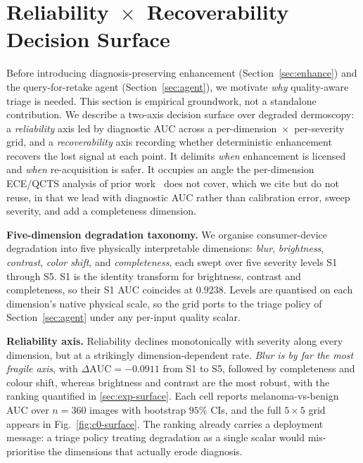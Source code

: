 
\section{Reliability~$\times$~Recoverability Decision Surface}
\label{sec:decision-surface}

Before introducing diagnosis-preserving enhancement (Section~\ref{sec:enhance}) and the query-for-retake agent (Section~\ref{sec:agent}), we motivate \emph{why} quality-aware triage is needed. This section is empirical groundwork, not a standalone contribution. We describe a two-axis decision surface over degraded dermoscopy: a \emph{reliability} axis led by diagnostic AUC across a per-dimension~$\times$~per-severity grid, and a \emph{recoverability} axis recording whether deterministic enhancement recovers the lost signal at each point. It delimits \emph{when} enhancement is licensed and \emph{when} re-acquisition is safer. It occupies an angle the per-dimension ECE/QCTS analysis of prior work~\citep{ANON-BMVC} does not cover, which we cite but do not reuse, in that we lead with diagnostic AUC rather than calibration error, sweep severity, and add a completeness dimension.

\textbf{Five-dimension degradation taxonomy.}
We organise consumer-device degradation into five physically interpretable dimensions: \emph{blur}, \emph{brightness}, \emph{contrast}, \emph{color shift}, and \emph{completeness}, each swept over five severity levels S1 through S5. S1 is the identity transform for brightness, contrast and completeness, so their S1 AUC coincides at $0.9238$. Levels are quantised on each dimension's native physical scale, so the grid ports to the triage policy of Section~\ref{sec:agent} under any per-input quality scalar.

\textbf{Reliability axis.}
Reliability declines monotonically with severity along every dimension, but at a strikingly dimension-dependent rate. \emph{Blur is by far the most fragile axis}, with $\Delta\mathrm{AUC}=-0.0911$ from S1 to S5, followed by completeness and colour shift, whereas brightness and contrast are the most robust, with the ranking quantified in \cref{sec:exp-surface}. Each cell reports melanoma-vs-benign AUC over $n=360$ images with bootstrap $95\%$ CIs, and the full $5\times5$ grid appears in Fig.~\ref{fig:c0-surface}. The ranking already carries a deployment message: a triage policy treating degradation as a single scalar would mis-prioritise the dimensions that actually erode diagnosis.

